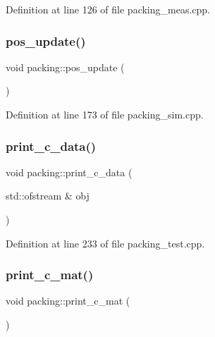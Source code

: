 Definition at line 126 of file packing\+\_\+meas.\+cpp.

\mbox{\label{classpacking_a0674ff540e56b7de2919fea2960b7703}} 
\subsubsection{\texorpdfstring{pos\+\_\+update()}{pos\_update()}}
{\footnotesize\ttfamily void packing\+::pos\+\_\+update (\begin{DoxyParamCaption}{ }\end{DoxyParamCaption})}



Definition at line 173 of file packing\+\_\+sim.\+cpp.

\mbox{\label{classpacking_a4d5591724c0cd87df921dcae97d24305}} 
\subsubsection{\texorpdfstring{print\+\_\+c\+\_\+data()}{print\_c\_data()}}
{\footnotesize\ttfamily void packing\+::print\+\_\+c\+\_\+data (\begin{DoxyParamCaption}\item[{std\+::ofstream \&}]{obj }\end{DoxyParamCaption})}



Definition at line 233 of file packing\+\_\+test.\+cpp.

\mbox{\label{classpacking_ad65b44ad181d5311b6f4b2177b118f82}} 
\subsubsection{\texorpdfstring{print\+\_\+c\+\_\+mat()}{print\_c\_mat()}\hspace{0.1cm}{\footnotesize\ttfamily [1/2]}}
{\footnotesize\ttfamily void packing\+::print\+\_\+c\+\_\+mat (\begin{DoxyParamCaption}{ }\end{DoxyParamCaption})}



